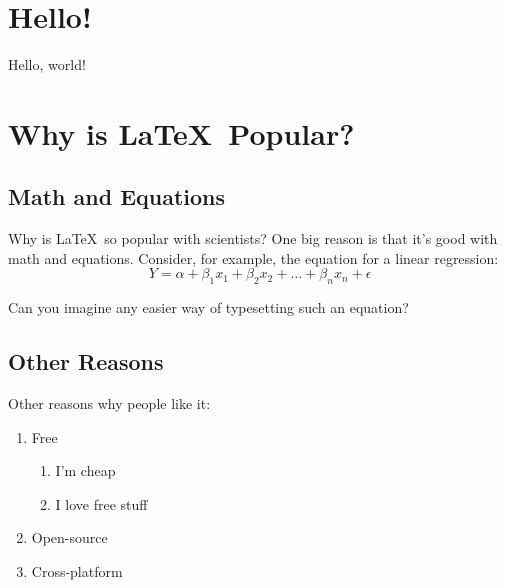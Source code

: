 \documentclass{article}
\begin{document}
\tableofcontents
\newpage

\section{Hello!}
Hello, world! \\

\section{Why is \LaTeX\ Popular?}
\subsection{Math and Equations}
Why is \LaTeX\ so popular with scientists? One big reason is that it's good with math and equations. Consider, for example, the equation for a linear regression: $$Y = \alpha + \beta_1x_1 + \beta_2x_2 + \ldots + \beta_nx_n + \epsilon$$

Can you imagine any easier way of typesetting such an equation? \\

\subsection{Other Reasons}
\noindent
Other reasons why people like it:
\begin{enumerate}
	\item{Free}
	\begin{enumerate}
			\item{I'm cheap}
			\item{I love free stuff}
	\end{enumerate}
	\item{Open-source}
	\item{Cross-platform}
\end{enumerate}
	
\end{document}
